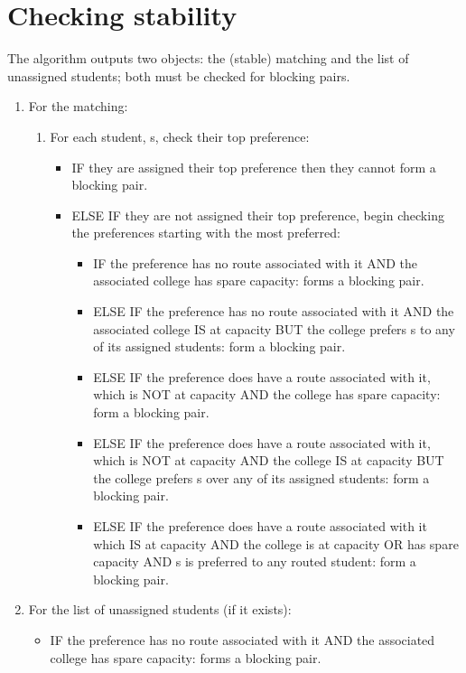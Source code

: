 \documentclass{article}
\begin{document}
\section{Checking stability}
The algorithm outputs two objects: the (stable) matching and the list of unassigned students; both must be checked for blocking pairs.
\begin{enumerate}
    \item For the matching:
    \begin{enumerate}
        \item For each student, s, check their top preference:
        \begin{itemize}
            \item IF they are assigned their top preference then they cannot form a blocking pair.
            \item ELSE IF they are not assigned their top preference, begin checking the preferences starting with the most preferred:
            \begin{itemize}
                \item IF the preference has no route associated with it AND the associated college has spare capacity: forms a blocking pair.
                \item ELSE IF the preference has no route associated with it AND the associated college IS at capacity BUT the college prefers s to any of its assigned students: form a blocking pair.
                \item ELSE IF the preference does have a route associated with it, which is NOT at capacity AND the college has spare capacity: form a blocking pair.
                \item ELSE IF the preference does have a route associated with it, which is NOT at capacity AND the college IS at capacity BUT the college prefers s over any of its assigned students: form a blocking pair.
                \item ELSE IF the preference does have a route associated with it which IS at capacity AND the college is at capacity OR has spare capacity AND s is preferred to any routed student: form a blocking pair.
            \end{itemize}
        \end{itemize}
    \end{enumerate}
    \item For the list of unassigned students (if it exists):
    \begin{itemize}
        \item IF the preference has no route associated with it AND the associated college has spare capacity: forms a blocking pair.

\end{itemize}
\end{enumerate}
\end{document}
